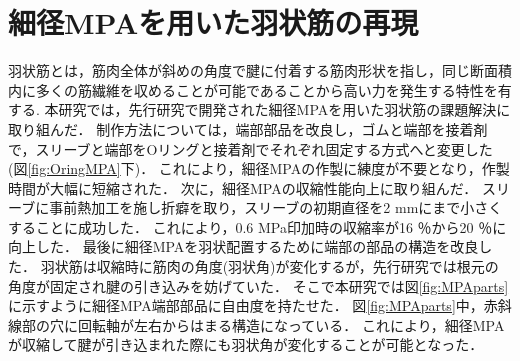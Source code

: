 \documentclass{jarticle}
\begin{document}
\section{細径MPAを用いた羽状筋の再現}
羽状筋とは，筋肉全体が斜めの角度で腱に付着する筋肉形状を指し，同じ断面積内に多くの筋繊維を収めることが可能であることから高い力を発生する特性を有する.
本研究では，先行研究\cite{crabrobot2}で開発された細径MPAを用いた羽状筋の課題解決に取り組んだ．
制作方法については，端部部品を改良し，ゴムと端部を接着剤で，スリーブと端部をOリングと接着剤でそれぞれ固定する方式へと変更した(図\ref{fig:OringMPA}下)．
これにより，細径MPAの作製に練度が不要となり，作製時間が大幅に短縮された．
次に，細径MPAの収縮性能向上に取り組んだ．
スリーブに事前熱加工を施し折癖を取り，スリーブの初期直径を2 mmにまで小さくすることに成功した．
これにより，0.6 MPa印加時の収縮率が16 ％から20 ％に向上した．
最後に細径MPAを羽状配置するために端部の部品の構造を改良した．
羽状筋は収縮時に筋肉の角度(羽状角)が変化するが，先行研究\cite{crabrobot2}では根元の角度が固定され腱の引き込みを妨げていた．
そこで本研究では図\ref{fig:MPAparts}に示すように細径MPA端部部品に自由度を持たせた．
図\ref{fig:MPAparts}中，赤斜線部の穴に回転軸が左右からはまる構造になっている．
これにより，細径MPAが収縮して腱が引き込まれた際にも羽状角が変化することが可能となった．
\end{document}
